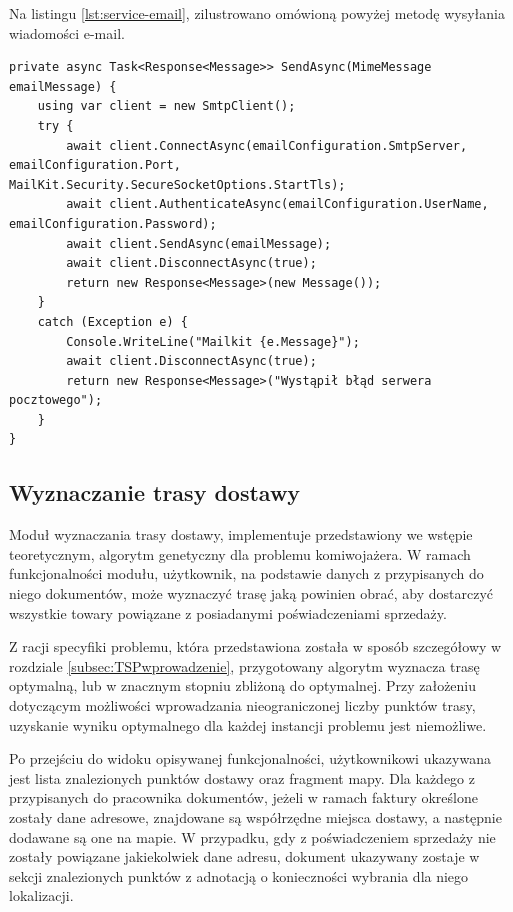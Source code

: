 Na listingu \ref{lst:service-email}, zilustrowano omówioną powyżej metodę wysyłania wiadomości e-mail.

\begin{lstlisting}[label=lst:service-email,caption=Kod metody serwisu odpowiedzialnej za wysyłanie wiadomości e-mail, captionpos=b,basicstyle=\footnotesize\ttfamily,style=sharpcstyle,language={[Sharp]C}]
private async Task<Response<Message>> SendAsync(MimeMessage emailMessage) {
	using var client = new SmtpClient();
	try {
		await client.ConnectAsync(emailConfiguration.SmtpServer, emailConfiguration.Port, MailKit.Security.SecureSocketOptions.StartTls);
		await client.AuthenticateAsync(emailConfiguration.UserName, emailConfiguration.Password);
		await client.SendAsync(emailMessage);
		await client.DisconnectAsync(true);
		return new Response<Message>(new Message());
	}
	catch (Exception e) {
		Console.WriteLine("Mailkit {e.Message}");
		await client.DisconnectAsync(true);
		return new Response<Message>("Wystąpił błąd serwera pocztowego");
	}
}
\end{lstlisting}
\subsection{Wyznaczanie trasy dostawy}
\label{sec:wyznaczanie-trasy}
Moduł wyznaczania trasy dostawy, implementuje przedstawiony we wstępie teoretycznym, algorytm genetyczny dla problemu komiwojażera. W ramach funkcjonalności modułu, użytkownik, na podstawie danych z przypisanych do niego dokumentów, może wyznaczyć trasę jaką powinien obrać, aby dostarczyć wszystkie towary powiązane z posiadanymi poświadczeniami sprzedaży.

Z racji specyfiki problemu, która przedstawiona została w sposób szczegółowy w rozdziale \ref{subsec:TSPwprowadzenie}, przygotowany algorytm wyznacza trasę optymalną, lub w znacznym stopniu zbliżoną do optymalnej. Przy założeniu dotyczącym możliwości wprowadzania nieograniczonej liczby punktów trasy, uzyskanie wyniku optymalnego dla każdej instancji problemu jest niemożliwe.

Po przejściu do widoku opisywanej funkcjonalności, użytkownikowi ukazywana jest lista znalezionych punktów dostawy oraz fragment mapy. Dla każdego z przypisanych do pracownika dokumentów, jeżeli w ramach faktury określone zostały dane adresowe, znajdowane są współrzędne miejsca dostawy, a następnie dodawane są one na mapie. W przypadku, gdy z poświadczeniem sprzedaży nie zostały powiązane jakiekolwiek dane adresu, dokument ukazywany zostaje w sekcji znalezionych punktów z adnotacją o konieczności wybrania dla niego lokalizacji.

